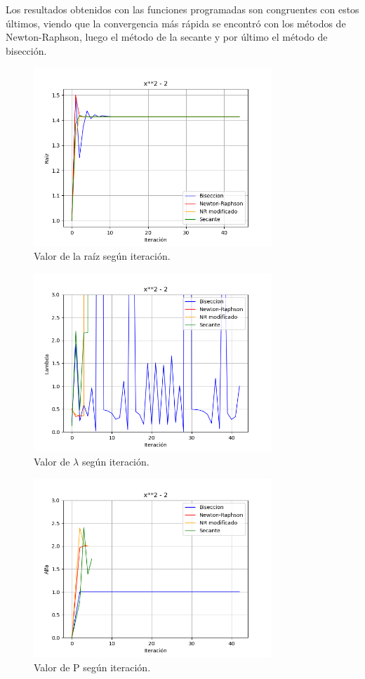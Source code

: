 \documentclass[titlepage,a4paper]{article}
\begin{document}
Los resultados obtenidos con las funciones programadas son congruentes con estos últimos, viendo que la convergencia más rápida se encontró con los métodos de Newton-Raphson, luego el método de la secante y por último el método de bisección.

\begin{figure}[H]
\centering
\includegraphics[width=0.8\textwidth]{raiz f1.png}
\caption{\label{fig:class01}Valor de la raíz según iteración.}
\end{figure}

\begin{figure}[H]
    \centering
    \includegraphics[width=0.8\textwidth]{lambda f1.png}
    \caption{\label{fig:class01}Valor de $\lambda$ según iteración.}
\end{figure}
\begin{figure}[H]
    \centering
    \includegraphics[width=0.8\textwidth]{alfa f1.png}
    \caption{\label{fig:class01}Valor de P según iteración.}
\end{figure}
\end{document}
